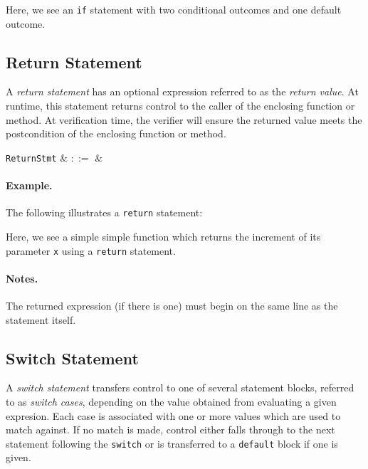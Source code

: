 

Here, we see an \lstinline{if} statement with two conditional outcomes
and one default outcome.


\subsection{Return Statement}
\label{c_stmts_return}
A {\em return statement} has an optional expression referred to as the {\em return value}.  At runtime, this statement returns control to the caller of the enclosing function or method.  At verification time, the verifier will ensure the returned value meets the \gls{postcondition} of the enclosing function or method.

\begin{syntax}
  \verb+ReturnStmt+ & $::=$ & \ \\
\end{syntax}

\paragraph{Example.} The following illustrates a \lstinline{return} statement:



Here, we see a simple simple function which returns the increment of its parameter \lstinline{x} using a \lstinline{return} statement.

\paragraph{Notes.} The returned expression (if there is one) must begin on the same line as the statement itself.


\subsection{Switch Statement}
\label{c_stmts_switch}
A {\em switch statement} transfers control to one of several statement blocks, referred to as {\em switch cases}, depending on the value obtained from evaluating a given expresion.  Each case is associated with one or more values which are used to match against.  If no match is made, control either falls through to the next statement following the \lstinline{switch} or is transferred to a \lstinline{default} block if one is given.

